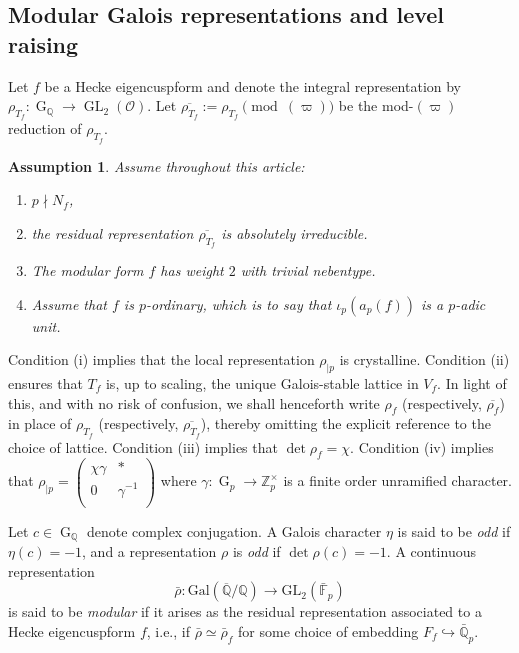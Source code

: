 \documentclass[table]{amsart}
\newtheorem{ass}[theorem]{Assumption}
\newcommand{\Z}{\mathbb{Z}}
\newcommand{\Q}{\mathbb{Q}}
\newcommand{\F}{\mathbb{F}}
\newcommand{\cO}{\mathcal{O}}
\newcommand{\op}[1]{\operatorname{#1}}
\newcommand\mtx[4] { \left( {\begin{array}{cc}
 #1 & #2 \\
 #3 & #4 \\
 \end{array} } \right)}
\numberwithin{equation}{section}
\begin{document}
\subsection{Modular Galois representations and level raising}
\par Let $f$ be a Hecke eigencuspform and denote the integral representation by $\rho_{T_f}:\op{G}_\Q\rightarrow \op{GL}_2(\cO)$. Let $\overline{\rho_{T_f}}:=\rho_{T_f}\pmod{(\varpi)}$ be the mod-$(\varpi)$ reduction of $\rho_{T_f}$. 

\begin{ass}
Assume throughout this article:
\begin{enumerate}
\item[(i)] $p \nmid N_f$,
\item[(ii)] the residual representation $\overline{\rho_{T_f}}$ is absolutely irreducible.
\item[(iii)] The modular form $f$ has weight $2$ with trivial nebentype. 
\item[(iv)] Assume that $f$ is $p$-ordinary, which is to say that $\iota_p(a_p(f))$ is a $p$-adic unit.
\end{enumerate}
\end{ass}
Condition (i) implies that the local representation $\rho_{|p}$ is crystalline. Condition (ii) ensures that $T_f$ is, up to scaling, the unique Galois-stable lattice in $V_f$. In light of this, and with no risk of confusion, we shall henceforth write $\rho_f$ (respectively, $\overline{\rho_f}$) in place of $\rho_{T_f}$ (respectively, $\overline{\rho_{T_f}}$), thereby omitting the explicit reference to the choice of lattice. Condition (iii) implies that $\op{det}\rho_f=\chi$. Condition (iv) implies that $\rho_{| p}=\mtx{\chi\gamma}{\ast}{0}{\gamma^{-1}}$ where $\gamma:\op{G}_p\rightarrow \Z_p^\times$ is a finite order unramified character.

\par Let $c \in \operatorname{G}_\Q$ denote complex conjugation. A Galois character $\eta$ is said to be \emph{odd} if $\eta(c) = -1$, and a representation $\rho$ is \emph{odd} if $\det\rho(c) = -1$. A continuous representation  
\[
\bar{\rho} : \mathrm{Gal}(\overline{\Q}/\Q) \to \mathrm{GL}_2(\bar{\F}_p)
\]
is said to be \emph{modular} if it arises as the residual representation associated to a Hecke eigencuspform $f$, i.e., if $\bar{\rho} \simeq \bar{\rho}_f$ for some choice of embedding $F_f \hookrightarrow \bar{\Q}_p$.
\end{document}
